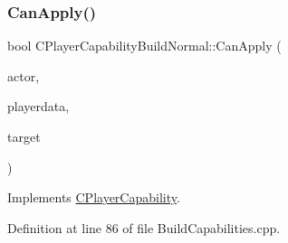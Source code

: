 \subsubsection{\texorpdfstring{Can\+Apply()}{CanApply()}}
{\footnotesize\ttfamily bool C\+Player\+Capability\+Build\+Normal\+::\+Can\+Apply (\begin{DoxyParamCaption}\item[{std\+::shared\+\_\+ptr$<$ \hyperlink{classCPlayerAsset}{C\+Player\+Asset} $>$}]{actor,  }\item[{std\+::shared\+\_\+ptr$<$ \hyperlink{classCPlayerData}{C\+Player\+Data} $>$}]{playerdata,  }\item[{std\+::shared\+\_\+ptr$<$ \hyperlink{classCPlayerAsset}{C\+Player\+Asset} $>$}]{target }\end{DoxyParamCaption})\hspace{0.3cm}{\ttfamily [virtual]}}



Implements \hyperlink{classCPlayerCapability_ae96263e0950f496492f8baeb877b9554}{C\+Player\+Capability}.



Definition at line 86 of file Build\+Capabilities.\+cpp.


